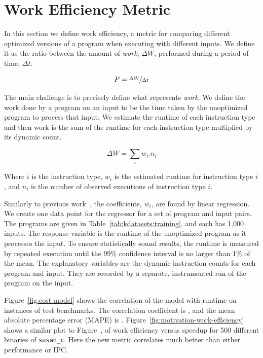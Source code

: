 \section{Work Efficiency Metric} \label{sec:metric}

    In this section we define work efficiency, a metric for comparing different optimized versions of a program when executing with
    different inputs. We define it as the ratio between the amount of \textit{work}, $\Delta W$, performed during a period of time, $\Delta
    t$.

    \[
       P = \nicefrac{\Delta W}{\Delta t}
    \]

    The main challenge is to precisely define what represents \textit{work}. We define the work done by a program on an input to be the
    time taken by the unoptimized program to process that input. We estimate the runtime of each instruction type and then work is the sum
    of the runtime for each instruction type multiplied by its dynamic count.
    
    \[ \Delta W = \sum_i w_i.n_i \]
    
    Where $i$ is the instruction type, $w_i$ is the estimated runtime for instruction type $i$, and $n_i$ is the number of observed
    executions of instruction type $i$.

    Similarly to previous work~\citep{giusto01,powell09,brandolese11}, the coefficients, $w_i$, are found by linear regression. We create
    one data point for the regressor for a set of program and input pairs. The programs are given in Table~\ref{tab:kdatasets:training},
    and each has 1,000 inputs. The response variable is the runtime of the unoptimized program as it processes the input. To ensure
    statistically sound results, the runtime is measured by repeated execution until the 99\% confidence interval is no larger than 1\% of
    the mean. The explanatory variables are the dynamic instruction counts for each program and input. They are recorded by a separate,
    instrumented run of the program on the input.

    Figure~\ref{fig:cost-model} shows the correlation of the model with runtime on instances of test benchmarks. The correlation
    coefficient is , and the mean absolute percentage error (MAPE) is . Figure~\ref{fig:motivation-work-efficiency}
    shows a similar plot to Figure~\FIXME{\ref{fig:???}}, of work efficiency versus speedup for 500 different binaries of \texttt{susan\_c}. Here the new metric correlates much better than either performance or IPC.

